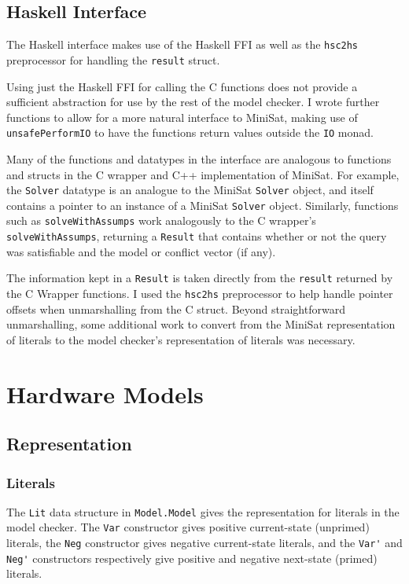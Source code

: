\documentclass[12pt,a4paper,twoside,openright]{report}
\begin{document}
\subsection{Haskell Interface}

The Haskell interface makes use of the Haskell FFI as well as the \verb,hsc2hs, preprocessor
for handling the \verb,result, struct.

Using just the Haskell FFI for calling the C functions does not provide a
sufficient abstraction for use by the rest of the model checker.
I wrote further functions to allow for a more natural interface to MiniSat,
 making use of \verb,unsafePerformIO, to have the functions return
values outside the \verb,IO, monad.

Many of the functions and datatypes in the interface are analogous to functions and structs in
the C wrapper and C++ implementation of MiniSat. For example, the \verb,Solver, datatype is an
analogue to the MiniSat \verb,Solver, object, and itself contains a pointer to an instance of
a MiniSat \verb,Solver, object. Similarly, functions such as \verb,solveWithAssumps, work
analogously to the C wrapper's \verb,solveWithAssumps,, returning a \verb,Result, that contains
whether or not the query was satisfiable and the model or conflict vector (if any).

The information kept in a \verb,Result, is taken directly from the \verb,result, returned by
the C Wrapper functions. I used the \verb,hsc2hs, preprocessor to help handle pointer offsets
when unmarshalling from the C struct. Beyond straightforward unmarshalling, some additional work
to convert from the MiniSat representation of literals to the model checker’s representation of
literals was necessary.

\section{Hardware Models}
\subsection{Representation}
\subsubsection{Literals}
The \verb,Lit, data structure in \verb,Model.Model, gives the representation for literals in
the model checker.
The \verb,Var, constructor gives positive current-state (unprimed) literals, the \verb,Neg,
constructor gives negative current-state literals, and the \verb,Var', and \verb,Neg', constructors
respectively give positive and negative next-state (primed) literals.
\end{document}
